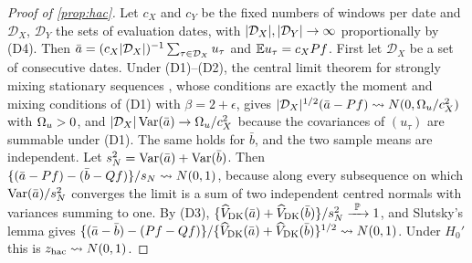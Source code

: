 \begin{proof}[Proof of \cref{prop:hac}]
Let $c_X$ and $c_Y$ be the fixed numbers of windows per date and $\mathcal D_X$, $\mathcal D_Y$ the
sets of evaluation dates, with $\lvert\mathcal D_X\rvert,\lvert\mathcal D_Y\rvert\to\infty$ proportionally by
(D4). Then $\bar a=(c_X\lvert\mathcal D_X\rvert)^{-1}\sum_{\tau\in\mathcal D_X}u_\tau$ and
$\mathbb{E} u_\tau=c_XPf$. First let $\mathcal D_X$ be a set of consecutive dates. Under (D1)--(D2), the
central limit theorem for strongly mixing stationary sequences \citep{herrndorf1984functional},
whose conditions are exactly the moment and mixing conditions of (D1) with $\beta=2+\epsilon$,
gives $\lvert\mathcal D_X\rvert^{1/2}(\bar a-Pf)\rightsquigarrow N(0,\Omega_u/c_X^2)$ with $\Omega_u>0$, and
$\lvert\mathcal D_X\rvert\operatorname{Var}(\bar a)\to\Omega_u/c_X^2$ because the covariances of $(u_\tau)$ are summable
under (D1). The same holds for $\bar b$, and the two sample means are independent. Let
$s_N^2=\operatorname{Var}(\bar a)+\operatorname{Var}(\bar b)$. Then $\{(\bar a-Pf)-(\bar b-Qf)\}/s_N\rightsquigarrow N(0,1)$, because along
every subsequence on which $\operatorname{Var}(\bar a)/s_N^2$ converges the limit is a sum of two independent
centred normals with variances summing to one. By (D3),
$\{\widehat V_{\mathrm{DK}}(\bar a)+\widehat V_{\mathrm{DK}}(\bar b)\}/s_N^2\xrightarrow{\ \mathbb{P}\ }1$, and Slutsky's lemma gives
$\{(\bar a-\bar b)-(Pf-Qf)\}/\{\widehat V_{\mathrm{DK}}(\bar a)+\widehat V_{\mathrm{DK}}(\bar b)\}^{1/2}\rightsquigarrow N(0,1)$.
Under $H_0'$ this is $z_{\mathrm{hac}}\rightsquigarrow N(0,1)$.
\end{proof}

